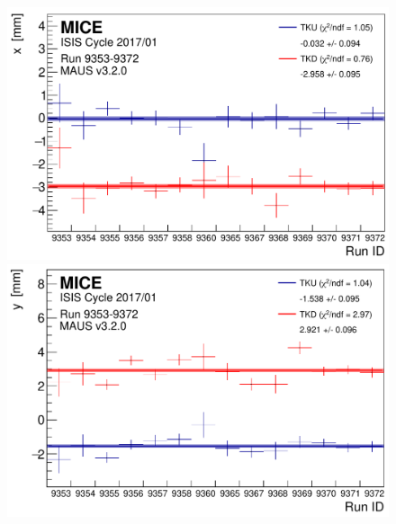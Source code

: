 \begin{figure}[htb]
  \begin{center}
    \begin{minipage}[b]{.45\textwidth}
      \begin{center}
        \includegraphics[width=\textwidth]{data_final/x_bestfit_edit.pdf}
      \end{center}
    \end{minipage}
    \hfill
    \begin{minipage}[b]{.45\textwidth}
      \begin{center}
        \includegraphics[width=\textwidth]{data_final/y_bestfit_edit.pdf}
      \end{center}
    \end{minipage}
    \begin{minipage}[b]{.45\textwidth}
      \begin{center}

\end{center}
\end{minipage}
\end{center}
\end{figure}
